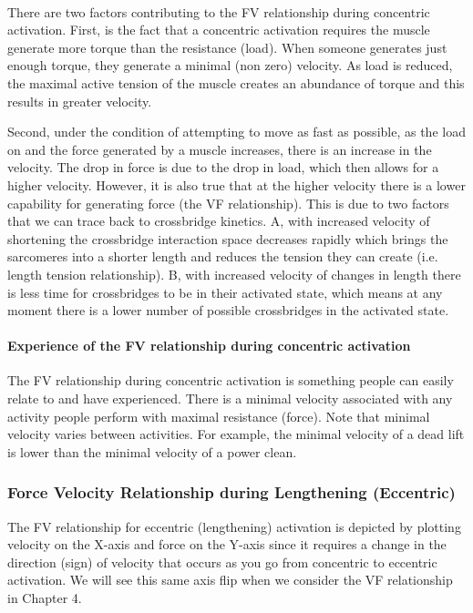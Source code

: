 \paragraph{}
There are two factors contributing to the FV relationship during concentric activation. First, is the fact that a concentric activation requires the muscle generate more torque than the resistance (load). When someone generates just enough torque, they generate a minimal (non zero) velocity. As load is reduced, the maximal active tension of the muscle creates an abundance of torque and this results in greater velocity. 

Second, under the condition of attempting to move as fast as possible, as the load on and the force generated by a muscle increases, there is an increase in the velocity. The drop in force is due to the drop in load, which then allows for a higher velocity. However, it is also true that at the higher velocity there is a lower capability for generating force (the VF relationship). This is due to two factors that we can trace back to crossbridge kinetics. A, with increased velocity of shortening the crossbridge interaction space decreases rapidly which brings the sarcomeres into a shorter length and reduces the tension they can create (i.e. length tension relationship). B, with increased velocity of changes in length there is less time for crossbridges to be in their activated state, which means at any moment there is a lower number of possible crossbridges in the activated state. 

\paragraph{Experience of the FV relationship during concentric activation}
The FV relationship during concentric activation is something people can easily relate to and have experienced. There is a minimal velocity associated with any activity people perform with maximal resistance (force). Note that minimal velocity varies between activities.  For example, the minimal velocity of a dead lift is lower than the minimal velocity of a power clean. 


\subsubsection{Force Velocity Relationship during Lengthening (Eccentric)}

The FV relationship for eccentric (lengthening) activation is depicted by plotting velocity on the X-axis and force on the Y-axis since it requires a change in the direction (sign) of velocity that occurs as you go from concentric to eccentric activation. We will see this same axis flip when we consider the VF relationship in Chapter 4.

